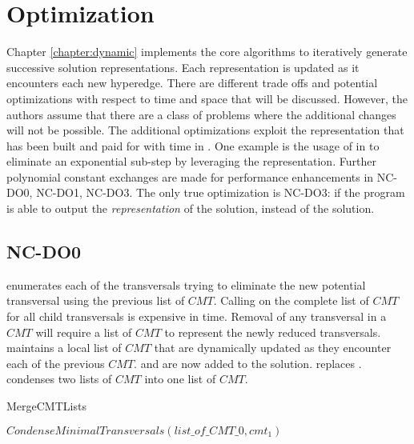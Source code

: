 \chapter{Optimization}

Chapter \ref{chapter:dynamic} implements the core algorithms to iteratively generate successive solution representations. Each representation is updated as it encounters each new hyperedge. There are different trade offs and potential optimizations with respect to time and space that will be discussed. However, the authors assume that there are a class of problems where the additional changes will not be possible.  The additional optimizations exploit the representation that has been built and paid for with time in . One example is the usage of  in  to eliminate an exponential sub-step by leveraging the representation. Further polynomial constant exchanges are made for performance enhancements in NC-DO0, NC-DO1, NC-DO3. The only true optimization is NC-DO3: if the program is able to output the \emph{representation} of the solution, instead of the solution.


\section{NC-DO0}
 enumerates each of the transversals trying to eliminate the new potential transversal using the previous list of $CMT$. Calling  on the complete list of $CMT$ for all child transversals is expensive in time. Removal of any transversal in a $CMT$ will require a list of $CMT$ to represent the newly reduced transversals.  maintains a local list of $CMT$ that are dynamically updated as they encounter each of the previous $CMT$.  and  are now added to the solution.  replaces .  condenses two lists of $CMT$ into one list of $CMT$. 

\begin{algorithm}[H]
    \centering
	\caption{MergeCMTLists}
	\label{MergeCMTLists}
	\begin{algorithmic}[1]
		\State $CondenseMinimalTransversals(list\_of\_CMT\_0,cmt_1)$
		\EndFor
		\EndFunction
	\end{algorithmic}
\end{algorithm}


